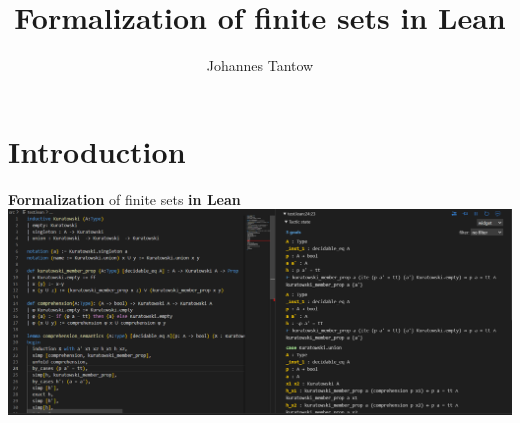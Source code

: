 \documentclass[aspectratio=169]{beamer}
\title[Finite sets]{Formalization of finite sets in Lean}
\author[J. Tantow]{Johannes Tantow}
\begin{document}
    \maketitle
    \section{Introduction}
    \begin{frame}[fragile]{\textbf{Formalization} of finite sets \textbf{in Lean}}
        \includegraphics[width=1\textwidth]{Lean_Preview.png}
    \end{frame}
\end{document}
